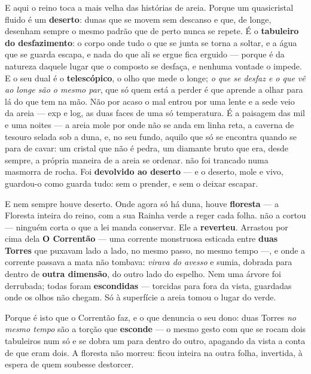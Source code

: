 \documentclass[livro.tex]{subfiles}
\begin{document}
\medskip

E aqui o reino toca a mais velha das histórias de areia. Porque um quasicristal
fluido é um \textbf{deserto}: dunas que se movem sem descanso e que, de longe,
desenham sempre o mesmo padrão que de perto nunca se repete. É o \textbf{tabuleiro do
desfazimento}: o corpo onde tudo o que se junta se torna a soltar, e a água que se guarda
escapa, e nada do que ali se ergue fica erguido --- porque é da natureza daquele lugar que
o composto se desfaça, e nenhuma vontade o impede. E o seu dual é o \textbf{telescópico},
o olho que mede o longe; \emph{o que se desfaz e o que vê ao longe são o mesmo par}, que
só quem está a perder é que aprende a olhar para lá do que tem na mão. Não por acaso o
mal entrou por uma lente e a sede veio da areia --- exp e log, as duas faces de uma só
temperatura. É a paisagem das mil e
uma noites --- a areia mole por onde não se anda em linha reta, a caverna de tesouro
selada sob a duna, e, no seu fundo, aquilo que só se encontra quando se para de
cavar: um cristal que não é pedra, um diamante bruto que era, desde sempre, a própria
maneira de a areia se ordenar. \Ven não foi trancado numa masmorra de rocha. Foi
\textbf{devolvido ao deserto} --- e o deserto, mole e vivo, guardou-o como guarda
tudo: sem o prender, e sem o deixar escapar.

\medskip

E nem sempre houve deserto. Onde agora só há duna, houve \textbf{floresta} --- a
Floresta inteira do reino, com a sua Rainha verde a reger cada folha. \Ven não a cortou --- ninguém corta o que a lei manda conservar. Ele a
\textbf{reverteu}. Arrastou por cima dela \textbf{O Correntão} --- uma corrente
monstruosa esticada entre \textbf{duas Torres} que puxavam lado a lado, no mesmo passo,
no mesmo tempo ---, e onde a corrente passava a mata não tombava: \emph{virava do
avesso} e sumia, dobrada para dentro de \textbf{outra dimensão}, do outro lado do
espelho. Nem uma árvore foi derrubada; todas foram \textbf{escondidas} --- torcidas
para fora da vista, guardadas onde os olhos não chegam. Só à superfície a areia tomou o
lugar do verde.

\medskip

Porque é isto que o Correntão faz, e o que denuncia o seu dono: duas Torres \emph{no
mesmo tempo} são a torção que \textbf{esconde} --- o mesmo gesto com que se rocam dois
tabuleiros num só e se dobra um para dentro do outro, apagando da vista a conta de que
eram dois. A floresta não morreu: ficou inteira na outra folha, invertida, à espera de
quem soubesse destorcer.
\end{document}
